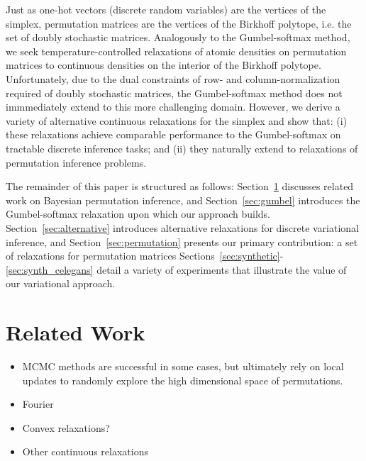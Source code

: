 \documentclass{article}
\begin{document}
Just as one-hot vectors (discrete random variables) are the vertices
of the simplex, permutation matrices are the vertices of the Birkhoff
polytope, i.e. the set of doubly stochastic matrices.  Analogously to
the Gumbel-softmax method, we seek temperature-controlled relaxations
of atomic densities on permutation matrices to continuous densities on
the interior of the Birkhoff polytope.  Unfortunately, due to the
dual constraints of row- and column-normalization required of doubly
stochastic matrices, the Gumbel-softmax method does not immmediately
extend to this more challenging domain.  However, we derive a variety
of alternative continuous relaxations for the simplex and show that:
(i) these relaxations achieve comparable performance to the Gumbel-softmax
  on tractable discrete inference tasks; and
(ii) they naturally extend to relaxations of permutation inference
  problems. 

The remainder of this paper is structured as follows: Section~\ref{sec:relatedwork}
discusses related work on Bayesian permutation inference, and Section~\ref{sec:gumbel}
introduces the Gumbel-softmax relaxation upon which our approach builds.
Section~\ref{sec:alternative} introduces alternative relaxations for
discrete variational inference, and Section~\ref{sec:permutation} presents
our primary contribution: a set of relaxations for permutation matrices
Sections~\ref{sec:synthetic}-\ref{sec:synth_celegans} detail a variety
of experiments that illustrate the value of our variational approach.
  
\section{Related Work}
\label{sec:relatedwork}

\begin{itemize}
  \item MCMC \citep{diaconis1988group} methods are successful
in some cases, but ultimately rely on local updates to randomly
explore the high dimensional space of permutations.

  \item Fourier \citep{kondor2007multi, huang2009fourier}

  \item Convex relaxations? \citep{lim2014beyond}

  \item Other continuous relaxations \citep{plis2011directional}
\end{itemize}
\end{document}
